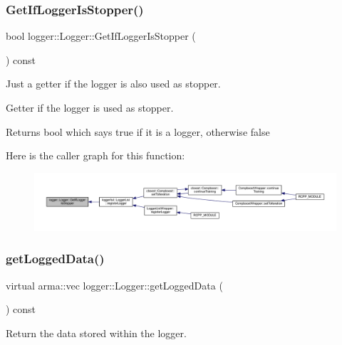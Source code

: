 \subsubsection{\texorpdfstring{Get\+If\+Logger\+Is\+Stopper()}{GetIfLoggerIsStopper()}}
{\footnotesize\ttfamily bool logger\+::\+Logger\+::\+Get\+If\+Logger\+Is\+Stopper (\begin{DoxyParamCaption}{ }\end{DoxyParamCaption}) const}



Just a getter if the logger is also used as stopper. 

Getter if the logger is used as stopper.

\begin{DoxyReturn}{Returns}
{\ttfamily bool} which says {\ttfamily true} if it is a logger, otherwise {\ttfamily false} 
\end{DoxyReturn}
Here is the caller graph for this function\+:\nopagebreak
\begin{figure}[H]
\begin{center}
\leavevmode
\includegraphics[width=350pt]{classlogger_1_1_logger_a3f473d158b7e5ee93ff70432d7f394ba_icgraph}
\end{center}
\end{figure}
\mbox{\label{classlogger_1_1_logger_aa4fc254c532172db3404b7c0bcd17092}} 
\subsubsection{\texorpdfstring{get\+Logged\+Data()}{getLoggedData()}}
{\footnotesize\ttfamily virtual arma\+::vec logger\+::\+Logger\+::get\+Logged\+Data (\begin{DoxyParamCaption}{ }\end{DoxyParamCaption}) const\hspace{0.3cm}{\ttfamily [pure virtual]}}



Return the data stored within the logger. 



